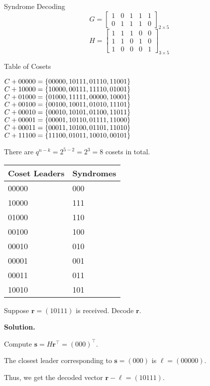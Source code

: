 \begin{Example}{Syndrome Decoding}{}
    \[ G=\begin{bmatrix}
            1 & 0 & 1 & 1 & 1 \\
            0 & 1 & 1 & 1 & 0
        \end{bmatrix}_{2\times 5} \]
    \[ H=\begin{bmatrix}
            1 & 1 & 1 & 0 & 0 \\
            1 & 1 & 0 & 1 & 0 \\
            1 & 0 & 0 & 0 & 1
        \end{bmatrix}_{3\times 5} \]
    \begin{table}[H]
        \centering
        \caption{Table of Cosets}
        \begin{multicols}{2}
            $ C+00000=\{00000,10111,01110,11001\} $\\
            $ C+10000=\{10000,00111,11110,01001\} $\\
            $ C+01000=\{01000,11111,00000,10001\} $\\
            $ C+00100=\{00100,10011,01010,11101\} $\\
            $ C+00010=\{00010,10101,01100,11011\} $\\
            $ C+00001=\{00001,10110,01111,11000\} $\\
            $ C+00011=\{00011,10100,01101,11010\} $\\
            $ C+11100=\{11100,01011,10010,00101\} $
        \end{multicols}
    \end{table}
    There are $ q^{n-k}=2^{5-2}=2^3=8 $ cosets in total.
    \begin{table}[H]
        \centering
        \begin{tabularx}{0.5\linewidth}{@{}YY@{}}
            Coset Leaders & Syndromes \\
                     & 000       \\
            10000         & 111       \\
            01000         & 110       \\
            00100         & 100       \\
            00010         & 010       \\
            00001         & 001       \\
            00011         & 011       \\
            10010         & 101
        \end{tabularx}
    \end{table}
    Suppose $ \bm{r}=(10111) $ is received. Decode $ \bm{r} $.

    \textbf{Solution.}

    Compute $ \bm{s}=H\bm{r}^\top=(000)^\top $.

    The closest leader corresponding to $ \bm{s}=(000) $ is $ \bm{\ell}=(00000) $.

    Thus, we get the decoded vector $ \bm{r}-\bm{\ell}=(10111) $.
\end{Example}
